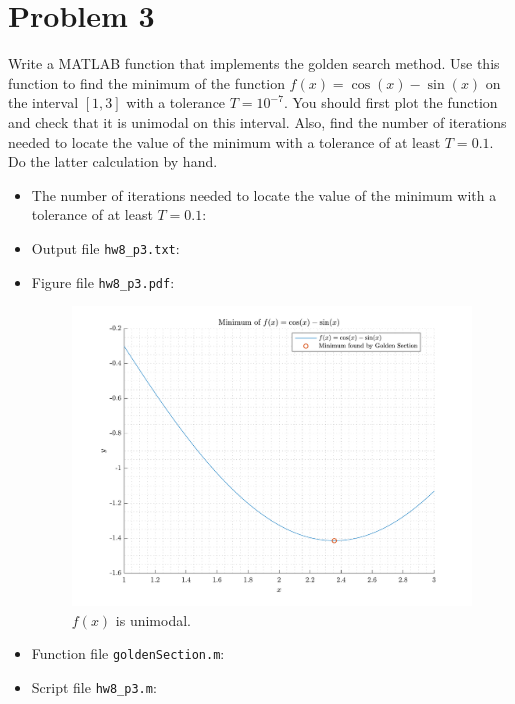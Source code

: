 \section{Problem 3}%
\label{sec:problem_3}
Write a MATLAB function that implements the golden search method. Use this function to find the minimum of the function $f(x) = \cos(x) - \sin(x)$ on the interval $[1, 3]$ with a tolerance $T = 10^{-7}$. You should  first plot the function and check that it is unimodal on this interval. Also, find the number of iterations needed to locate the value of the minimum with a tolerance of at least $T = 0.1$. Do the latter calculation by hand.
\begin{solution}
  \quad
  \begin{itemize}
  \item The number of iterations needed to locate the value of the minimum with a tolerance of at least $T = 0.1$:
      \quad \vfill                               %
  \item Output file \verb|hw8_p3.txt|:
    
  \item Figure file \verb|hw8_p3.pdf|:
    \begin{figure}[!hbtp]
      \centering
      \includegraphics[width=0.8\linewidth]{../src/hw8_p3.pdf}
      \caption{$f(x)$ is unimodal.}%
      \label{fig:hw8_p3}
    \end{figure}
  \item Function file \verb|goldenSection.m|:
    
  \item Script file \verb|hw8_p3.m|:
    
  \end{itemize}
\end{solution}

